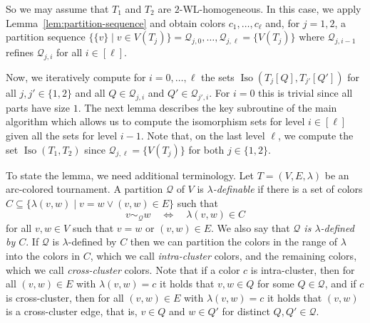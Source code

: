 \documentclass{theoretics}
\newcommand{\CQ}{{\mathcal Q}}
\DeclareMathOperator{\Iso}{Iso}
\begin{document}
So we may assume that $T_1$ and $T_2$ are $2$-WL-homogeneous.
In this case, we apply Lemma~\ref{lem:partition-sequence} and obtain colors $c_1,\ldots,c_\ell$ and, for $j=1,2$, a partition sequence $\{\{v\} \mid v \in V(T_j)\} = \CQ_{j,0}, \dots, \CQ_{j,\ell} = \{V(T_j)\}$ where $\CQ_{j,i-1}$ refines $\CQ_{j,i}$ for all $i \in [\ell]$.

Now, we iteratively compute for $i=0,\dots,\ell$ the sets $\Iso(T_j[Q],T_{j'}[Q'])$ for all $j,j' \in \{1,2\}$ and all $Q \in \CQ_{j,i}$ and $Q' \in \CQ_{j',i}$.
For $i = 0$ this is trivial since all parts have size $1$.
The next lemma describes the key subroutine of the main algorithm which allows us to compute the isomorphism sets for level $i \in [\ell]$ given all the sets for level $i-1$.
Note that, on the last level $\ell$, we compute the set $\Iso(T_1,T_2)$ since $\CQ_{j,\ell} = \{V(T_j)\}$ for both $j \in \{1,2\}$.

To state the lemma, we need additional terminology.
Let $T = (V,E,\lambda)$ be an arc-colored tournament.
A partition $\CQ$ of $V$ is \emph{$\lambda$-definable} if there is a set of colors $C \subseteq \{\lambda(v,w) \mid v= w \vee (v,w) \in E\}$ such that
\[v \sim_\CQ w \quad\iff\quad \lambda(v,w) \in C\]
for all $v,w \in V$ such that $v = w$ or $(v,w) \in E$.
We also say that \emph{$\CQ$ is $\lambda$-defined by $C$}.
If $\CQ$ is $\lambda$-defined by $C$ then we can partition the colors in the range of $\lambda$ into the colors in $C$, which we call \emph{intra-cluster} colors, and the remaining colors, which we call \emph{cross-cluster} colors.
Note that if a color $c$ is intra-cluster, then for all $(v,w) \in E$ with $\lambda(v,w) = c$ it holds that $v,w \in Q$ for some $Q \in \CQ$,
and if $c$ is cross-cluster, then for all $(v,w) \in E$ with $\lambda(v,w) = c$ it holds that $(v,w)$ is a cross-cluster edge, that is, $v \in Q$ and $w \in Q'$ for distinct $Q,Q' \in \CQ$.
\end{document}
